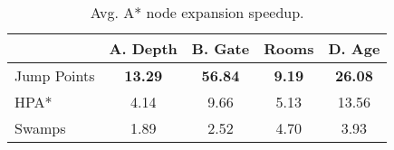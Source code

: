 \begin{table}[ht]
\label{table:nodes}
\begin{center}
\begin{tabular}{lcccc}
  \hline
 & A. Depth & B. Gate & Rooms & D. Age \\ 
  \hline
Jump Points & \textbf{13.29} & \textbf{56.84} & \textbf{9.19} & \textbf{26.08} \\ 
  HPA* & 4.14 & 9.66 & 5.13 & 13.56 \\ 
  Swamps & 1.89 & 2.52 & 4.70 & 3.93 \\ 
   \hline
\end{tabular}
\caption{Avg. A* node expansion speedup.} 
\end{center}
\end{table}

